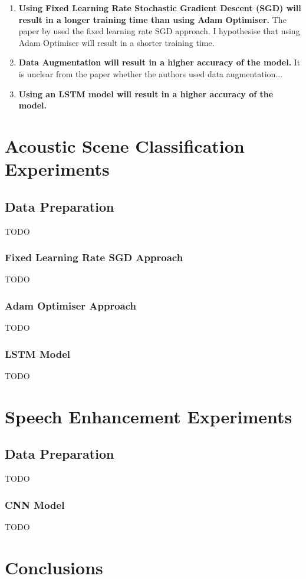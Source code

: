 \documentclass[logo,bsc,singlespacing,parskip,online]{infthesis}
\begin{document}
\begin{enumerate}
   \item \textbf{Using Fixed Learning Rate Stochastic Gradient Descent (SGD) will result in a longer training time than using Adam Optimiser.} The paper by \citet{Huwel2020HearDS} used the fixed learning rate SGD approach.
   I hypothesise that using Adam Optimiser will result in a shorter training time.
   \item \textbf{Data Augmentation will result in a higher accuracy of the model.} It is unclear from the paper whether the authors used data augmentation...
   \item \textbf{Using an LSTM model will result in a higher accuracy of the model.}
\end{enumerate}


\chapter{Acoustic Scene Classification Experiments}
\label{chap:acoustic-scene-classification}
\section{Data Preparation}
TODO
\subsection{Fixed Learning Rate SGD Approach}
TODO
\subsection{Adam Optimiser Approach}
TODO
\subsection{LSTM Model}
TODO

\chapter{Speech Enhancement Experiments}
\section{Data Preparation}
TODO
\subsection{CNN Model}
TODO

\chapter{Conclusions}
\end{document}
